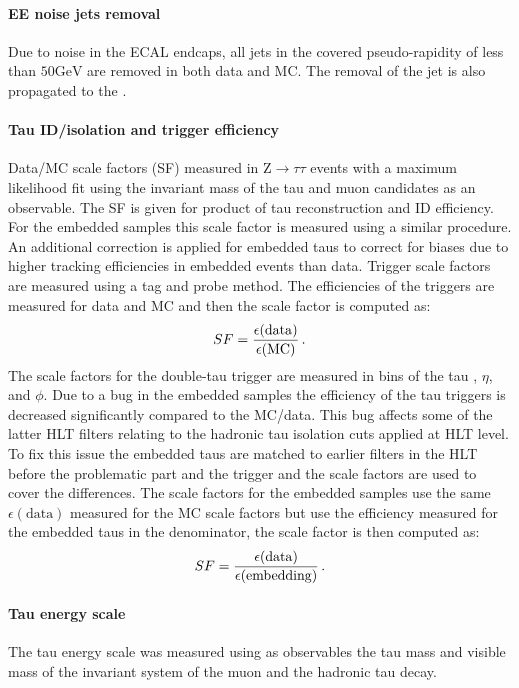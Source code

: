 \paragraph{EE noise jets removal} Due to noise in the ECAL endcaps, all jets in the covered pseudo-rapidity of less than $50 \mathrm{GeV}$ are removed in both data and MC. The removal of the jet is also propagated to the \met.

\paragraph{Tau ID/isolation and trigger efficiency} Data/MC scale factors (SF) measured in $\mathrm{Z}\rightarrow\tau\tau$ events with a maximum likelihood fit using the invariant mass of the tau and muon candidates as an observable. The SF is given for product of tau reconstruction and ID efficiency. For the embedded samples this scale factor is measured using a similar procedure. An additional correction is applied for embedded taus to correct for biases due to higher tracking efficiencies in embedded events than data. Trigger scale factors are measured using a tag and probe method. The efficiencies of the triggers are measured for data and MC and then the scale factor is computed as:
\begin{equation}
    SF = \frac{\epsilon(\mathrm{data})}{\epsilon(\mathrm{MC})} \mend
\end{equation}
The scale factors for the double-tau trigger are measured in bins of the tau \pt, $\eta$, and $\phi$. Due to a bug in the embedded samples the efficiency of the tau triggers is decreased significantly compared to the MC/data. This bug affects some of the latter HLT filters relating to the hadronic tau isolation cuts applied at HLT level. To fix this issue the embedded taus are matched to earlier filters in the HLT before the problematic part and the trigger and the scale factors are used to cover the differences. The scale factors for the embedded samples use the same $\epsilon(\mathrm{data})$ measured for the MC scale factors but use the efficiency measured for the embedded taus in the denominator, the scale factor is then computed as:
\begin{equation}
    SF = \frac{\epsilon(\mathrm{data})}{\epsilon(\mathrm{embedding})} \mend
\end{equation}

\paragraph{Tau energy scale} The tau energy scale was measured using as observables the tau mass and visible mass of the invariant system of the muon and the hadronic tau decay. 

